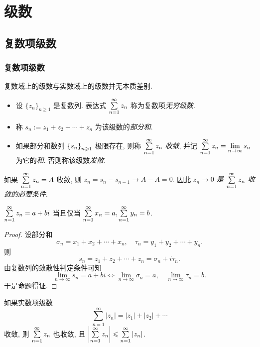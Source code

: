 
\chapter{级数}
\section{复数项级数}

\subsection{复数项级数}

复数域上的级数与实数域上的级数并无本质差别.

\begin{definition}
	\begin{itemize}
		\item 设 $\{z_n\}_{n\ge1}$ 是复数列. 表达式 $\sum\limits_{n=1}^\infty z_n$ 称为复数项\emph{无穷级数}.
		\item 称 $s_n:=z_1+z_2+\cdots+z_n$ 为该级数的\emph{部分和}.
		\item 如果部分和数列 ${\left\{s_n\right\}}_{n\geqslant 1}$ 极限存在, 则称 $\sum\limits_{n=1}^\infty z_n$ \emph{收敛}, 并记 $\sum\limits_{n=1}^\infty z_n=\lim\limits_{n\to\infty}s_n$ 为它的\emph{和}. 否则称该级数\emph{发散}.
	\end{itemize}
\end{definition}

如果 $\sum\limits_{n=1}^\infty z_n=A$ 收敛, 则 $z_n=s_n-s_{n-1}\to A-A=0$.
因此 \emph{$z_n\to0$ 是 $\sum\limits_{n=1}^\infty z_n$ 收敛的必要条件}.

\begin{theorem}
	$\sum\limits_{n=1}^\infty z_n=a+bi$ 当且仅当 $\sum\limits_{n=1}^\infty x_n=a,\sum\limits_{n=1}^\infty y_n=b$.
\end{theorem}

\begin{proof}
	设部分和
	\[\sigma_n=x_1+x_2+\cdots+x_n,\quad
		\tau_n=y_1+y_2+\cdots+y_n.\]
	{则
		\[s_n=z_1+z_2+\cdots+z_n=\sigma_n+i\tau_n.\]由复数列的敛散性判定条件可知
		\[\lim_{n\to\infty}s_n=a+bi\iff	\lim_{n\to\infty}\sigma_n=a,\quad \lim_{n\to\infty}\tau_n=b.\]于是命题得证.\qedhere}
\end{proof}

\begin{theorem}
	如果实数项级数
	\[\sum_{n=1}^\infty|z_n|=|z_1|+|z_2|+\cdots\]
	收敛, 则 $\sum\limits_{n=1}^\infty z_n$ 也收敛, 且 $\left|\sum\limits_{n=1}^\infty z_n\right|\leqslant\sum\limits_{n=1}^\infty |z_n|$.
\end{theorem}


